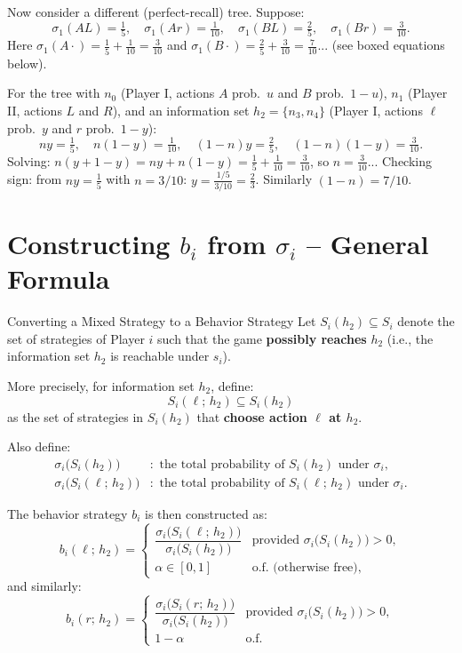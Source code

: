 \documentclass[12pt, a4paper]{article}
\begin{document}
\medskip
Now consider a different (perfect-recall) tree. Suppose:
\[
  \sigma_1(AL) = \tfrac{1}{5}, \quad \sigma_1(Ar) = \tfrac{1}{10}, \quad
  \sigma_1(BL) = \tfrac{2}{5}, \quad \sigma_1(Br) = \tfrac{3}{10}.
\]
Here $\sigma_1(A\cdot) = \tfrac{1}{5}+\tfrac{1}{10} = \tfrac{3}{10}$ and $\sigma_1(B\cdot)= \tfrac{2}{5}+\tfrac{3}{10}=\tfrac{7}{10}$... (see boxed equations below).

For the tree with $n_0$ (Player I, actions $A$ prob.\ $u$ and $B$ prob.\ $1-u$), $n_1$ (Player II, actions $L$ and $R$), and an information set $h_2 = \{n_3, n_4\}$ (Player I, actions $\ell$ prob.\ $y$ and $r$ prob.\ $1-y$):
\[
  \boxed{ny = \tfrac{1}{5},\quad n(1-y) = \tfrac{1}{10},\quad (1-n)y = \tfrac{2}{5},\quad (1-n)(1-y) = \tfrac{3}{10}.}
\]
Solving: $n(y + 1-y) = ny + n(1-y) = \tfrac{1}{5}+\tfrac{1}{10} = \tfrac{3}{10}$, so $n = \tfrac{3}{10}$... Checking sign: from $ny = \tfrac{1}{5}$ with $n = 3/10$: $y = \tfrac{1/5}{3/10} = \tfrac{2}{3}$. Similarly $(1-n) = 7/10$.

\section{Constructing $b_i$ from $\sigma_i$ -- General Formula}

\begin{defbox}{Converting a Mixed Strategy to a Behavior Strategy}
  Let $S_i(h_2) \subseteq S_i$ denote the set of strategies of Player $i$ such that the game \textbf{possibly reaches} $h_2$ (i.e., the information set $h_2$ is reachable under $s_i$).

  \medskip
  More precisely, for information set $h_2$, define:
  \[
    S_i(\ell;\,h_2) \subseteq S_i(h_2)
  \]
  as the set of strategies in $S_i(h_2)$ that \textbf{choose action $\ell$ at $h_2$}.

  \medskip
  Also define:
  \begin{align*}
    \sigma_i\!\bigl(S_i(h_2)\bigr)   &: \text{ the total probability of } S_i(h_2) \text{ under } \sigma_i, \\
    \sigma_i\!\bigl(S_i(\ell;\,h_2)\bigr) &: \text{ the total probability of } S_i(\ell;\,h_2) \text{ under } \sigma_i.
  \end{align*}

  The behavior strategy $b_i$ is then constructed as:
  \[
    b_i(\ell;\,h_2) =
    \begin{cases}
      \dfrac{\sigma_i\!\bigl(S_i(\ell;\,h_2)\bigr)}{\sigma_i\!\bigl(S_i(h_2)\bigr)} & \text{provided } \sigma_i\!\bigl(S_i(h_2)\bigr) > 0, \\[8pt]
      \alpha \in [0,1] & \text{o.f.\ (otherwise free)},
    \end{cases}
  \]
  and similarly:
  \[
    b_i(r;\,h_2) =
    \begin{cases}
      \dfrac{\sigma_i\!\bigl(S_i(r;\,h_2)\bigr)}{\sigma_i\!\bigl(S_i(h_2)\bigr)} & \text{provided } \sigma_i\!\bigl(S_i(h_2)\bigr) > 0, \\[8pt]
      1 - \alpha & \text{o.f.}
    \end{cases}
  \]
\end{defbox}
\end{document}
